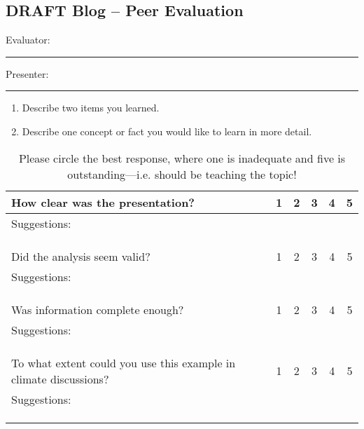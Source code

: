 \documentclass{article}\usepackage[]{graphicx}\usepackage[]{color}
\begin{document}
\subsection{DRAFT Blog -- Peer Evaluation}

\bigskip
Evaluator: \rule{7cm}{0.4pt}

\bigskip

\noindent Presenter: \rule{7cm}{0.4pt}

\begin{enumerate}
 \setlength\itemsep{4em}
  \item Describe two items you learned.
  \item Describe one concept or fact you would like to learn in more detail.
\end{enumerate}


\begin{table}[ht!]
\caption{Please circle the best response, where one is inadequate and five is outstanding---i.e. should be teaching the topic!}
\begin{tabular}{|p{4in}|ccccc|}\hline
How clear was the presentation?     & 1 & 2 & 3 & 4 & 5 \\ \hline
Suggestions: &&&&& \\ &&&&& \\ &&&&& \\
&&&&& \\ \hline
Did the analysis seem valid?        & 1 & 2 & 3 & 4 & 5 \\ \hline
Suggestions: &&&&& \\ &&&&& \\ &&&&& \\
&&&&& \\ \hline
Was information complete enough?            & 1 & 2 & 3 & 4 & 5 \\ \hline
Suggestions: &&&&& \\ &&&&& \\ &&&&& \\
&&&&& \\ \hline
To what extent could you use this example in climate discussions?            & 1 & 2 & 3 & 4 & 5 \\ \hline
Suggestions: &&&&& \\ &&&&& \\ &&&&& \\
&&&&& \\ \hline
\end{tabular}
\end{table}
\end{document}

